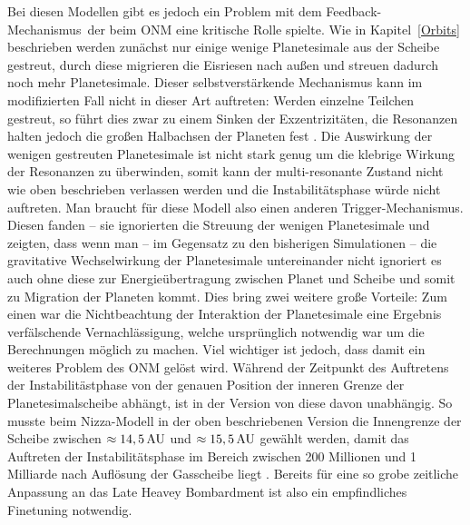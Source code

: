 \documentclass[12pt,a4paper,twoside,open=right,bibliography=totoc]{scrbook}
\renewcommand{\cite}{ \citep}
\begin{document}
Bei diesen Modellen gibt es jedoch ein Problem mit dem \glqq Feedback-Mechanismus\grqq\ der beim ONM eine kritische Rolle spielte. Wie in Kapitel~\ref{Orbits} beschrieben werden zunächst nur einige wenige Planetesimale  aus der Scheibe gestreut, durch diese migrieren die Eisriesen nach außen und streuen dadurch noch mehr Planetesimale. Dieser selbstverstärkende Mechanismus kann im modifizierten Fall nicht in dieser Art auftreten: Werden einzelne Teilchen gestreut, so führt dies zwar zu einem Sinken der Exzentrizitäten, die Resonanzen halten jedoch die großen Halbachsen der Planeten fest\cite{Levison2011}.
Die Auswirkung der wenigen gestreuten Planetesimale ist nicht stark genug um die klebrige Wirkung der Resonanzen zu überwinden, somit kann der multi-resonante Zustand nicht wie oben beschrieben verlassen werden und die Instabilitätsphase würde nicht auftreten.
Man braucht für diese Modell also einen anderen Trigger-Mechanismus. Diesen fanden \cite{Levison2011} -- sie ignorierten die Streuung der wenigen Planetesimale und zeigten, dass wenn man -- im Gegensatz zu den bisherigen Simulationen -- die gravitative Wechselwirkung der Planetesimale untereinander nicht ignoriert es auch ohne diese zur Energieübertragung zwischen Planet und Scheibe und somit zu Migration der Planeten kommt.
Dies bring zwei weitere große Vorteile:
Zum einen war die Nichtbeachtung der Interaktion der Planetesimale eine Ergebnis verfälschende Vernachlässigung, welche ursprünglich notwendig war um die Berechnungen möglich zu machen. %
Viel wichtiger ist jedoch, dass damit ein weiteres Problem des ONM gelöst wird. Während der Zeitpunkt des Auftretens der Instabilitästphase von der genauen Position der inneren Grenze der Planetesimalscheibe abhängt, ist in der Version von \cite{Morbidelli2007b, Levison2011} diese davon unabhängig.
So musste beim Nizza-Modell in der oben beschriebenen Version die Innengrenze der Scheibe zwischen $\approx\unit[14,5]{AU}$ und $\approx\unit[15,5]{AU}$ gewählt werden, damit das Auftreten der Instabilitätsphase im Bereich zwischen 200 Millionen und 1 Milliarde nach Auflösung der Gasscheibe liegt\cite{Gomes2005, Levison2011}.
Bereits für eine so grobe zeitliche Anpassung an das Late Heavey Bombardment ist also ein empfindliches Finetuning notwendig.
\end{document}
